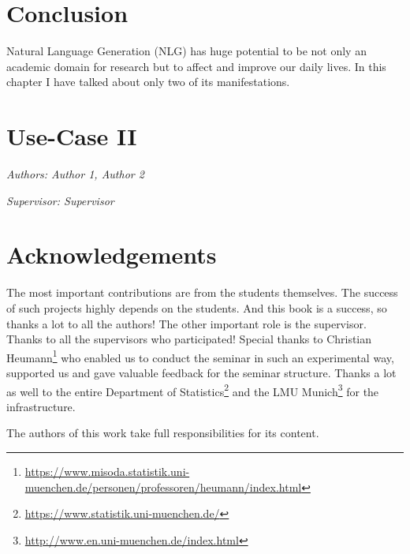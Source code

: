 \documentclass[]{krantz}
\renewcommand{\href}[2]{#2\footnote{\url{#1}}}
\begin{document}
\hypertarget{conclusion}{%
\chapter{Conclusion}\label{conclusion}}

Natural Language Generation (NLG) has huge potential to be not only an academic domain for research but to affect and improve our daily lives. In this chapter I have talked about only two of its manifestations.

\hypertarget{use-case-ii}{%
\chapter{Use-Case II}\label{use-case-ii}}

\emph{Authors: Author 1, Author 2}

\emph{Supervisor: Supervisor}

\hypertarget{acknowledgements}{%
\chapter{Acknowledgements}\label{acknowledgements}}

The most important contributions are from the students themselves.
The success of such projects highly depends on the students.
And this book is a success, so thanks a lot to all the authors!
The other important role is the supervisor.
Thanks to all the supervisors who participated!
Special thanks to \href{https://www.misoda.statistik.uni-muenchen.de/personen/professoren/heumann/index.html}{Christian Heumann} who enabled us to conduct the seminar in such an experimental way, supported us and gave valuable feedback for the seminar structure.
Thanks a lot as well to the entire \href{https://www.statistik.uni-muenchen.de/}{Department of Statistics} and the \href{http://www.en.uni-muenchen.de/index.html}{LMU Munich} for the infrastructure.

The authors of this work take full responsibilities for its content.



\backmatter
\printindex
\end{document}
